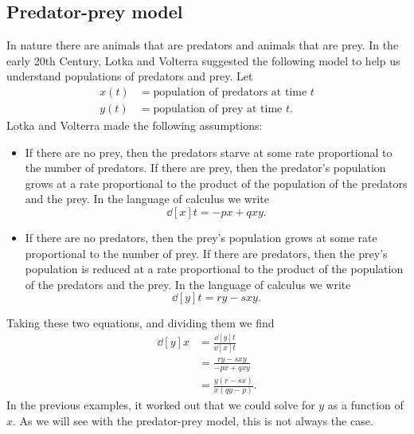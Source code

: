 \documentclass{ximera}
\begin{document}
\subsection{Predator-prey model}

In nature there are animals that are predators and animals that are
prey. In the early 20th Century, Lotka and Volterra suggested the
following model to help us understand populations of predators and
prey. Let
\begin{align*}
  x(t) &= \text{population of predators at time $t$}\\
  y(t) &= \text{population of prey at time $t$}.
\end{align*}
Lotka and Volterra made the following assumptions:
\begin{itemize}
  \item If there are no prey, then the predators starve at some rate
    proportional to the number of predators. If there are prey, then
    the predator's population grows at a rate proportional to the product of the
    population of the predators and the prey. In the language of calculus we write
    \[
    \dd[x]{t} = -p x + q x y.
    \]
  \item If there are no predators, then the prey's population grows
    at some rate proportional to the number of prey. If there are
    predators, then the prey's population is reduced at a rate
    proportional to the product of the population of the predators and
    the prey. In the language of calculus we write
    \[
    \dd[y]{t} = r y - s xy.
    \]
\end{itemize}
Taking these two equations, and dividing them we find
\begin{align*}
\dd[y]{x} &= \frac{\dd[y]{t}}{\dd[x]{t}}\\
&=\frac{r y - s xy}{-p x + q x y}\\
&=\frac{y(r-sx)}{x(qy-p)}.
\end{align*}
In the previous examples, it worked out that we could solve for $y$ as
a function of $x$.  As we will see with the predator-prey model, this
is not always the case.
\end{document}
